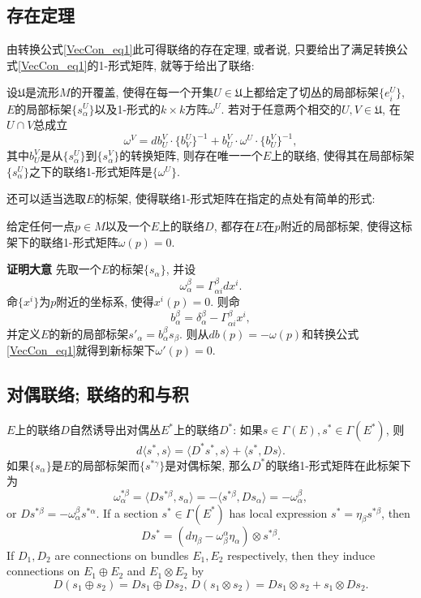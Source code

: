 \subsection{存在定理}
由转换公式\autoref{VecCon_eq1}此可得联络的存在定理, 或者说, 只要给出了满足转换公式\autoref{VecCon_eq1}的1-形式矩阵, 就等于给出了联络:
\begin{theorem}{}
设$\mathfrak{U}$是流形$M$的开覆盖, 使得在每一个开集$U\in\mathfrak{U}$上都给定了切丛的局部标架$\{e^U_i\}$, $E$的局部标架$\{s^U_\alpha\}$以及1-形式的$k\times k$方阵$\omega^U$. 若对于任意两个相交的$U,V\in\mathfrak{U}$, 在$U\cap V$总成立
$$
\omega^V=db^V_U\cdot \{b_V^U\}^{-1}+b^V_U\cdot\omega^U\cdot \{b^V_U\}^{-1},
$$
其中$b^V_U$是从$\{s^U_\alpha\}$到$\{s^V_\alpha\}$的转换矩阵, 则存在唯一一个$E$上的联络, 使得其在局部标架$\{s^U_\alpha\}$之下的联络1-形式矩阵是$\{\omega^U\}$.
\end{theorem}

还可以适当选取$E$的标架, 使得联络1-形式矩阵在指定的点处有简单的形式:
\begin{theorem}{}
给定任何一点$p\in M$以及一个$E$上的联络$D$, 都存在$E$在$p$附近的局部标架, 使得这标架下的联络1-形式矩阵$\omega(p)=0$.
\end{theorem}
\textbf{证明大意} 先取一个$E$的标架$\{s_\alpha\}$, 并设
$$
\omega^\beta_\alpha=\Gamma_{\alpha i}^\beta dx^i.
$$
命$\{x^i\}$为$p$附近的坐标系, 使得$x^i(p)=0$. 则命
$$
b_\alpha^\beta=\delta_\alpha^\beta-\Gamma_{\alpha i}^\beta x^i,
$$
并定义$E$的新的局部标架$s'_\alpha=b_\alpha^\beta s_\beta$. 则从$db(p)=-\omega(p)$和转换公式\autoref{VecCon_eq1}就得到新标架下$\omega'(p)=0$.

\subsection{对偶联络; 联络的和与积}
$E$上的联络$D$自然诱导出对偶丛$E^*$上的联络$D^*$: 如果$s\in\Gamma(E),s^*\in\Gamma(E^*)$, 则
$$
d\langle s^*,s\rangle=\langle D^*s^*,s\rangle+\langle s^*,Ds\rangle.
$$
如果$\{s_\alpha\}$是$E$的局部标架而$\{s^{*\gamma}\}$是对偶标架, 那么$D^*$的联络1-形式矩阵在此标架下为
$$
\omega^{*\beta}_\alpha
=\langle Ds^{*\beta},s_\alpha\rangle
=-\langle s^{*\beta},Ds_\alpha\rangle
=-\omega^\beta_\alpha,
$$
or $Ds^{*\beta}=-\omega^\beta_\alpha s^{*\alpha}$. If a section $s^*\in\Gamma(E^*)$ has local expression $s^*=\eta_\beta s^{*\beta}$, then
$$Ds^*=(d\eta_\beta-\omega_\beta^\alpha\eta_\alpha)\otimes s^{*\beta}.$$
If $D_1,D_2$ are connections on bundles $E_1,E_2$ respectively, then they induce connections on $E_1\oplus E_2$ and $E_1\otimes E_2$ by
$$D(s_1\oplus s_2)=Ds_1\oplus Ds_2,\,D(s_1\otimes s_2)=Ds_1\otimes s_2+s_1\otimes Ds_2.$$